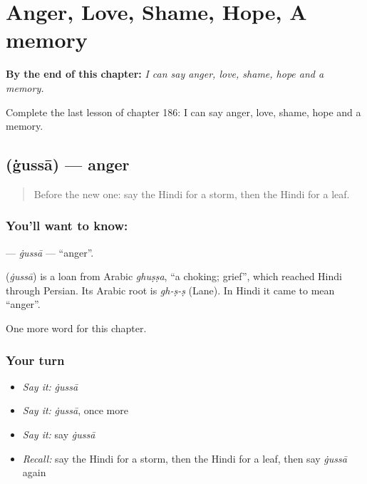 
\chapter{Anger, Love, Shame, Hope, A memory}
\label{ch:hi-anger-love-shame-hope-a-memory}

\begin{chapteropening}
\textbf{By the end of this chapter:} \emph{I can say anger, love, shame, hope and a memory.}

Complete the last lesson of chapter 186: I can say anger, love, shame, hope and a memory.
\end{chapteropening}

\section[\texorpdfstring{\hi{ग़ुस्सा} (ġussā)}{ग़ुस्सा (ġussā)}]{ (ġussā) — anger}

\label{lesson:HI-C186-gussa}



\begin{quote}
Before the new one: say the Hindi for a storm, then the Hindi for a leaf.
\end{quote}

\subsection*{You'll want to know: }
\textbf{} — \emph{ġussā} — \textquotedblleft{}anger\textquotedblright{}.

\begin{cousinweb}
\textbf{} (\emph{ġussā}) is a loan from Arabic \emph{ghuṣṣa}, \textquotedblleft{}a choking; grief\textquotedblright{}, which reached Hindi through Persian. Its Arabic root is \emph{gh-ṣ-ṣ} (Lane). In Hindi it came to mean \textquotedblleft{}anger\textquotedblright{}.
\end{cousinweb}

\begin{grammarlens}[title={What you've built}]
One more word for this chapter.
\end{grammarlens}

\subsection*{Your turn}
\begin{itemize}
\raggedright
  \item \emph{Say it:} \emph{ġussā}
  \item \emph{Say it:} \emph{ġussā}, once more
  \item \emph{Say it:} say \emph{ġussā}
  \item \emph{Recall:} say the Hindi for a storm, then the Hindi for a leaf, then say \emph{ġussā} again
\end{itemize}

